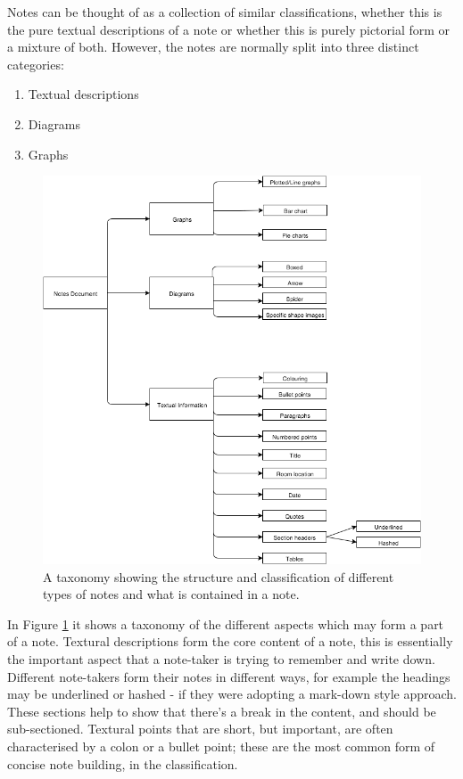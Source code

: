 Notes can be thought of as a collection of similar classifications, whether this is the pure textual descriptions of a note or whether this is purely pictorial form or a mixture of both. However, the notes are normally split into three distinct categories:
\begin{enumerate}
	\item Textual descriptions
	\item Diagrams
	\item Graphs
\end{enumerate}
\begin{figure}[h!]
\includegraphics[scale=0.5]{images/taxonomy}
\centering
\caption{A taxonomy showing the structure and classification of different types of notes and what is contained in a note.}
 \label{fig:taxonomyofnotes}
\end{figure}

In Figure \ref{fig:taxonomyofnotes} it shows a taxonomy of the different aspects which may form a part of a note. Textural descriptions form the core content of a note, this is essentially the important aspect that a note-taker is trying to remember and write down. Different note-takers form their notes in different ways, for example the headings may be underlined or hashed - if they were adopting a mark-down style approach. These sections help to show that there's a break in the content, and should be sub-sectioned. Textural points that are short, but important, are often characterised by a colon or a bullet point; these are the most common form of concise note building, in the classification.

